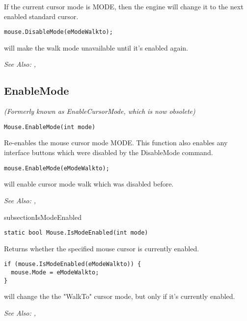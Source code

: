 If the current cursor mode is MODE, then the engine will change it to the
next enabled standard cursor.

\begin{verbatim}
mouse.DisableMode(eModeWalkto);
\end{verbatim}
will make the walk mode unavailable until it's enabled again.

\it{See Also:} ,


\subsection{EnableMode}\label{Mouse.EnableMode}%

\it{(Formerly known as EnableCursorMode, which is now obsolete)}

\begin{verbatim}
Mouse.EnableMode(int mode)
\end{verbatim}
Re-enables the mouse cursor mode MODE. This function also enables any
interface buttons which were disabled by the DisableMode command.

\begin{verbatim}
mouse.EnableMode(eModeWalkto);
\end{verbatim}
will enable cursor mode walk which was disabled before.

\it{See Also:} ,


subsection{IsModeEnabled}\label{Mouse.IsModeEnabled}%

\begin{verbatim}
static bool Mouse.IsModeEnabled(int mode)
\end{verbatim}

Returns whether the specified mouse cursor is currently enabled.

\begin{verbatim}
if (mouse.IsModeEnabled(eModeWalkto)) {
  mouse.Mode = eModeWalkto;
}
\end{verbatim}
will change the the "WalkTo" cursor mode, but only if it's currently enabled.

\it{See Also:} ,



